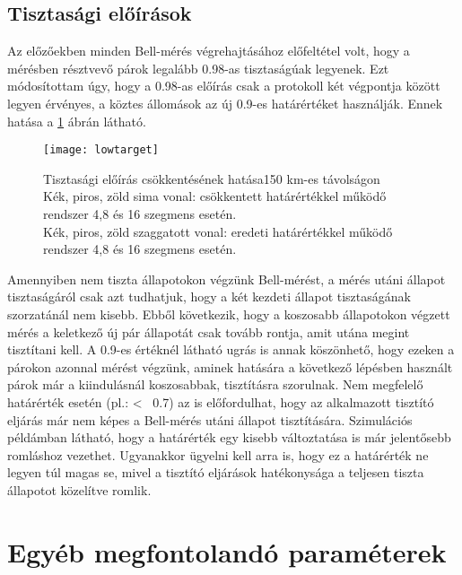 \subsection{Tisztasági előírások}
Az előzőekben minden Bell-mérés végrehajtásához előfeltétel volt, hogy a mérésben résztvevő párok legalább 0.98-as tisztaságúak legyenek. Ezt módosítottam úgy, hogy a 0.98-as előírás csak a protokoll két végpontja között legyen érvényes, a köztes állomások az új 0.9-es határértéket használják. Ennek hatása a \ref{fig:pur3} ábrán látható. 

\begin{figure}[H]
\centering
\texttt{[image: lowtarget]}
\caption[Határérték csökkentése]
{Tisztasági előírás csökkentésének hatása150 km-es távolságon \\
Kék, piros, zöld sima vonal: csökkentett határértékkel működő rendszer 4,8 és 16 szegmens esetén. \\
Kék, piros, zöld szaggatott vonal: eredeti határértékkel működő rendszer 4,8 és 16 szegmens esetén.
}
\label{fig:pur3}
\end{figure}

Amennyiben nem tiszta állapotokon végzünk Bell-mérést, a mérés utáni állapot tisztaságáról csak azt tudhatjuk, hogy a két kezdeti állapot tisztaságának szorzatánál nem kisebb. Ebből következik, hogy a koszosabb állapotokon végzett mérés a keletkező új pár állapotát csak tovább rontja, amit utána megint tisztítani kell. A 0.9-es értéknél látható ugrás is annak köszönhető, hogy ezeken a párokon azonnal mérést végzünk, aminek hatására a következő lépésben használt párok már a kiindulásnál koszosabbak, tisztításra szorulnak. Nem megfelelő határérték esetén (pl.: < ~0.7) az is előfordulhat, hogy az alkalmazott tisztító eljárás már nem képes a Bell-mérés utáni állapot tisztítására. Szimulációs példámban látható, hogy a határérték egy kisebb változtatása is már jelentősebb romláshoz vezethet. Ugyanakkor ügyelni kell arra is, hogy ez a határérték ne legyen túl magas se, mivel a tisztító eljárások hatékonysága a teljesen tiszta állapotot közelítve romlik.

\section{Egyéb megfontolandó paraméterek}

